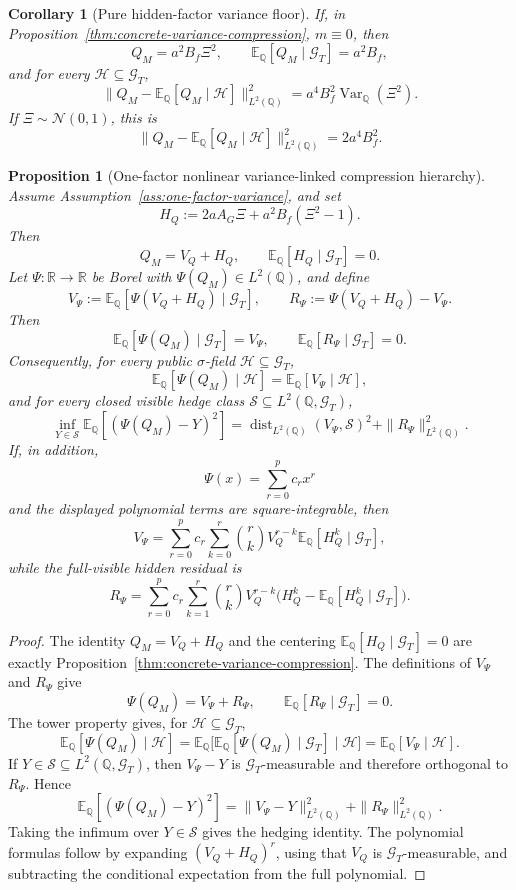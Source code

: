 \documentclass[11pt,a4paper]{amsart}
\theoremstyle{plain}
\newtheorem{proposition}[theorem]{Proposition}
\newtheorem{corollary}[theorem]{Corollary}
\theoremstyle{definition}
\theoremstyle{remark}
\DeclareMathOperator{\Var}{Var}
\DeclareMathOperator{\dist}{dist}
\newcommand{\R}{\mathbb{R}}
\newcommand{\QQ}{\mathbb{Q}}
\newcommand{\EE}{\mathbb{E}}
\newcommand{\cG}{\mathcal{G}}
\newcommand{\cH}{\mathcal{H}}
\newcommand{\cS}{\mathcal{S}}
\begin{document}
\begin{corollary}[Pure hidden-factor variance floor]\label{cor:pure-hidden-variance-floor}
If, in Proposition~\ref{thm:concrete-variance-compression}, \(m\equiv0\), then
\[
        Q_M=a^2B_f\Xi^2,
        \qquad
        \EE_\QQ[Q_M\mid\cG_T]=a^2B_f,
\]
and for every \(\cH\subseteq\cG_T\),
\[
        \|Q_M-\EE_\QQ[Q_M\mid\cH]\|_{L^2(\QQ)}^2=a^4B_f^2\Var_\QQ(\Xi^2).
\]
If \(\Xi\sim\mathcal N(0,1)\), this is
\[
        \|Q_M-\EE_\QQ[Q_M\mid\cH]\|_{L^2(\QQ)}^2=2a^4B_f^2.
\]
\end{corollary}

\begin{proposition}[One-factor nonlinear variance-linked compression hierarchy]\label{thm:concrete-nonlinear-variance-compression}
Assume Assumption~\ref{ass:one-factor-variance}, and set
\[
        H_Q:=2aA_G\Xi+a^2B_f(\Xi^2-1).
\]
Then
\[
        Q_M=V_Q+H_Q,
        \qquad
        \EE_\QQ[H_Q\mid\cG_T]=0.
\]
Let \(\Psi:\R\to\R\) be Borel with \(\Psi(Q_M)\in L^2(\QQ)\), and define
\[
        V_\Psi:=\EE_\QQ[\Psi(V_Q+H_Q)\mid\cG_T],
        \qquad
        R_\Psi:=\Psi(V_Q+H_Q)-V_\Psi .
\]
Then
\[
        \EE_\QQ[\Psi(Q_M)\mid\cG_T]=V_\Psi,
        \qquad
        \EE_\QQ[R_\Psi\mid\cG_T]=0.
\]
Consequently, for every public \(\sigma\)-field \(\cH\subseteq\cG_T\),
\[
        \EE_\QQ[\Psi(Q_M)\mid\cH]=\EE_\QQ[V_\Psi\mid\cH],
\]
and for every closed visible hedge class \(\cS\subseteq L^2(\QQ,\cG_T)\),
\[
        \inf_{Y\in\cS}\EE_\QQ[(\Psi(Q_M)-Y)^2]
        =
        \dist_{L^2(\QQ)}(V_\Psi,\cS)^2+\|R_\Psi\|_{L^2(\QQ)}^2 .
\]
If, in addition,
\[
        \Psi(x)=\sum_{r=0}^p c_rx^r
\]
and the displayed polynomial terms are square-integrable, then
\[
        V_\Psi
        =
        \sum_{r=0}^p c_r
        \sum_{k=0}^r \binom{r}{k}
        V_Q^{r-k}\EE_\QQ[H_Q^k\mid\cG_T],
\]
while the full-visible hidden residual is
\[
        R_\Psi
        =
        \sum_{r=0}^p c_r
        \sum_{k=1}^r \binom{r}{k}
        V_Q^{r-k}
        \bigl(H_Q^k-\EE_\QQ[H_Q^k\mid\cG_T]\bigr).
\]
\end{proposition}

\begin{proof}
The identity \(Q_M=V_Q+H_Q\) and the centering
\(\EE_\QQ[H_Q\mid\cG_T]=0\) are exactly Proposition~\ref{thm:concrete-variance-compression}.  The
definitions of \(V_\Psi\) and \(R_\Psi\) give
\[
        \Psi(Q_M)=V_\Psi+R_\Psi,
        \qquad
        \EE_\QQ[R_\Psi\mid\cG_T]=0.
\]
The tower property gives, for \(\cH\subseteq\cG_T\),
\[
        \EE_\QQ[\Psi(Q_M)\mid\cH]
        =
        \EE_\QQ\bigl[\EE_\QQ[\Psi(Q_M)\mid\cG_T]\mid\cH\bigr]
        =
        \EE_\QQ[V_\Psi\mid\cH].
\]
If \(Y\in\cS\subseteq L^2(\QQ,\cG_T)\), then \(V_\Psi-Y\) is \(\cG_T\)-measurable and therefore
orthogonal to \(R_\Psi\).  Hence
\[
        \EE_\QQ[(\Psi(Q_M)-Y)^2]
        =
        \|V_\Psi-Y\|_{L^2(\QQ)}^2+\|R_\Psi\|_{L^2(\QQ)}^2.
\]
Taking the infimum over \(Y\in\cS\) gives the hedging identity.  The polynomial formulas follow by
expanding \((V_Q+H_Q)^r\), using that \(V_Q\) is \(\cG_T\)-measurable, and subtracting the
conditional expectation from the full polynomial.
\end{proof}
\end{document}
